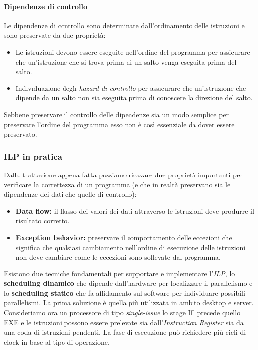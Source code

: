 \paragraph{Dipendenze di controllo}
Le dipendenze di controllo sono determinate dall'ordinamento delle istruzioni e sono preservate da due proprietà:
\begin{itemize}
\item Le istruzioni devono essere eseguite nell'ordine del programma per assicurare che un'istruzione che si trova prima di un salto venga eseguita prima del salto.
\item Individuazione degli \emph{hazard di controllo} per assicurare che un'istruzione che dipende da un salto non sia eseguita prima di conoscere la direzione del salto.
\end{itemize}
Sebbene preservare il controllo delle dipendenze sia un modo semplice per preservare l'ordine del programma esso non è così essenziale da dover essere preservato.
\subsubsection{ILP in pratica}
Dalla trattazione appena fatta possiamo ricavare due proprietà importanti per verificare la correttezza di un programma (e che in realtà preservano sia le dipendenze dei dati che quelle di controllo):
\begin{itemize}
\item \textbf{Data flow:} il flusso dei valori dei dati attraverso le istruzioni deve produrre il risultato corretto.
\item \textbf{Exception behavior:} preservare il comportamento delle eccezioni che significa che qualsiasi cambiamento nell'ordine di esecuzione delle istruzioni non deve cambiare come le eccezioni sono sollevate dal programma.
\end{itemize}
Esistono due tecniche fondamentali per supportare e implementare l'\emph{ILP}, lo \textbf{scheduling dinamico} che dipende dall'hardware per localizzare il parallelismo e lo \textbf{scheduling statico} che fa affidamento sul software per individuare possibili parallelismi. La prima soluzione è quella più utilizzata in ambito desktop e server.\\
Consideriamo ora un processore di tipo \emph{single-issue} lo stage IF precede quello EXE e le istruzioni possono essere prelevate sia dall'\emph{Instruction Register} sia da una coda di istruzioni pendenti. La fase di esecuzione può richiedere più cicli di clock in base al tipo di operazione.\\
